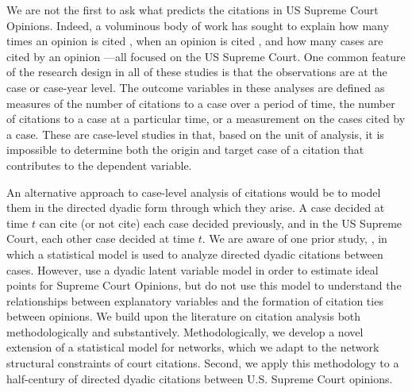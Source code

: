 \documentclass[headsepline=true, abstracton]{scrartcl}
\begin{document}
We are not the first to ask what predicts the citations in US Supreme Court Opinions. Indeed, a voluminous body of work has sought to explain how many times an opinion is cited \citep[e.g.,][]{cross2010determinants,benjamin2012standing,fix2019effect}, when an opinion is cited \citep[e.g.,][]{black2013citation,spriggs2001explaining}, and how many cases are cited by an opinion \citep[e.g.,][]{lupu2013strategic}---all focused on the US Supreme Court. One common feature of the research design in all of these studies is that the observations are at the case or case-year level. The outcome variables in these analyses are defined as measures of the number of citations to a case over a period of time, the number of citations to a case at a particular time, or a measurement on the cases cited by a case. These are case-level studies in that, based on the unit of analysis, it is impossible to determine both the origin and target case of a citation that contributes to the dependent variable.

An alternative approach to case-level analysis of citations would be to model them in the directed dyadic form through which they arise. A case decided at time $t$ can cite (or not cite) each case decided previously, and in the US Supreme Court, each other case decided at time $t$. We are aware of one prior study, \citet{clark2010locating}, in which a statistical model is used to analyze directed dyadic citations between cases. However, \citet{clark2010locating} use a dyadic latent variable model in order to estimate ideal points for Supreme Court Opinions, but do not use this model to understand the relationships between explanatory variables and the formation of citation ties between opinions. We build upon the literature on citation analysis both methodologically and substantively. Methodologically, we develop a novel extension of a statistical model for networks, which we adapt to the network structural constraints of court citations. Second, we apply this methodology to a half-century of directed dyadic citations between U.S. Supreme Court opinions.
\end{document}
